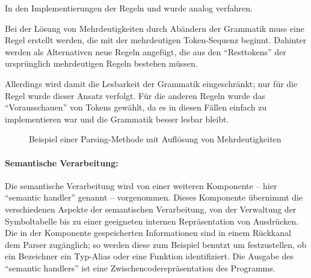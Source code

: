 \documentclass[twoside,a4paper,fleqn,12pt]{article}
\begin{document}
In den Implementierungen der Regeln  und  wurde analog verfahren.

Bei der Lösung von Mehrdeutigkeiten durch Abändern der Grammatik muss eine Regel erstellt werden,
die mit der mehrdeutigen Token-Sequenz beginnt. Dahinter werden als Alternativen neue Regeln angefügt,
die aus den "`Resttokens"' der ursprünglich mehrdeutigen Regeln bestehen müssen. %

Allerdings wird damit die Lesbarkeit der Grammatik eingeschränkt; nur für die Regel  wurde dieser Ansatz verfolgt.
Für die anderen Regeln wurde das "`Vorausschauen"' von Tokens gewählt, da es in diesen Fällen einfach zu implementieren war
und die Grammatik besser lesbar bleibt.

\begin{figure}[!h]
   \centering
  
  \caption{Beispiel einer Parsing-Methode mit Auflösung von Mehrdeutigkeiten}
  \label{fig:ParseProgramStatements}
\end{figure}

\paragraph{Semantische Verarbeitung:}
Die semantische Verarbeitung wird von einer weiteren Komponente -- hier ``semantic handler'' genannt -- vorgenommen. 
Dieses Komponente übernimmt die verschiedenen Aspekte der semantischen Verarbeitung, von der Verwaltung der
Symboltabelle bis zu einer geeigneten internen Repräsentation von Ausdrücken. Die in der Komponente gespeicherten Informationen sind
in einem Rückkanal dem Parser zugänglich; so werden diese zum Beispiel benutzt um festzustellen, ob ein Bezeichner ein
Typ-Alias oder eine Funktion identifiziert.
Die Ausgabe des ``semantic handlers'' ist eine Zwischencoderepräsentation des Programms.

\end{document}

